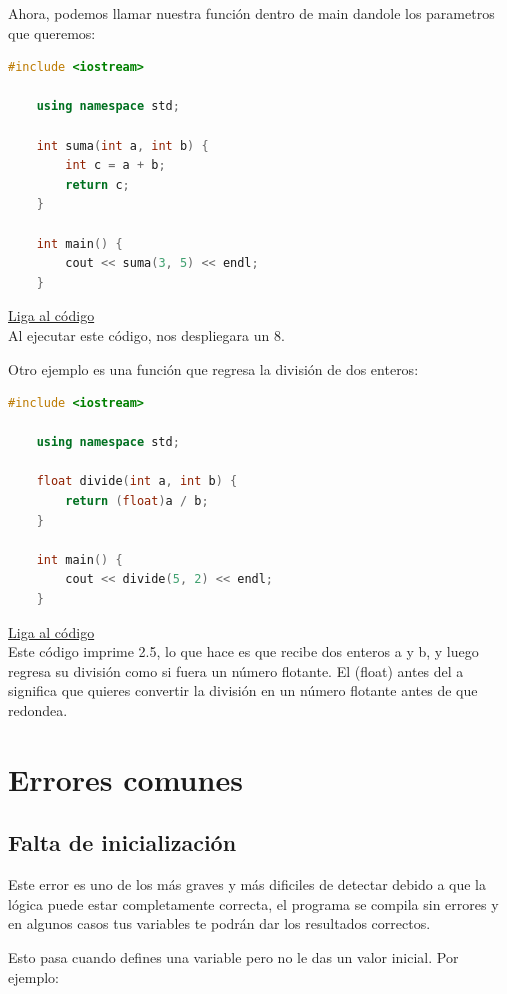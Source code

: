 \documentclass{article}
\begin{document}
Ahora, podemos llamar nuestra función dentro de main dandole los parametros que queremos:

\begin{lstlisting}[language=C++, caption=Función de suma]
    #include <iostream>

    using namespace std;
    
    int suma(int a, int b) {
        int c = a + b;
        return c;
    }

    int main() {
        cout << suma(3, 5) << endl;
    }
\end{lstlisting}
\href{https://repl.it/@Jamesscn/Funciones}{Liga al código}\\

Al ejecutar este código, nos despliegara un 8.

Otro ejemplo es una función que regresa la división de dos enteros:

\begin{lstlisting}[language=C++, caption=Función de división]
    #include <iostream>

    using namespace std;
    
    float divide(int a, int b) {
        return (float)a / b;
    }

    int main() {
        cout << divide(5, 2) << endl;
    }
\end{lstlisting}
\href{https://repl.it/@Jamesscn/Funciones}{Liga al código}\\

Este código imprime 2.5, lo que hace es que recibe dos enteros a y b, y luego regresa su división como si fuera un número flotante. El (float) antes del a significa que quieres convertir la división en un número flotante antes de que redondea.

\section{Errores comunes}

\subsection{Falta de inicialización}
Este error es uno de los más graves y más dificiles de detectar debido a que la lógica puede estar completamente correcta, el programa se compila sin errores y en algunos casos tus variables te podrán dar los resultados correctos.

Esto pasa cuando defines una variable pero no le das un valor inicial. Por ejemplo:
\end{document}
